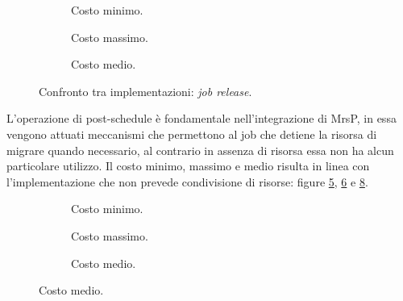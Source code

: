 {  \begin{figure}[htb]
    \centering
      \begin{subfigure}[b]{0.49\textwidth}
        \centering
        \resizebox{\linewidth}{!}\graficoReleaseMIN  
        \caption{Costo minimo.}
        \label{fig:releaseMin}
      \end{subfigure}
      \begin{subfigure}[b]{0.49\textwidth}
        \centering
        \resizebox{\linewidth}{!}\graficoReleaseMAX
        \caption{Costo massimo.}
        \label{fig:releaseMax}
      \end{subfigure}
      \begin{subfigure}[b]{0.49\textwidth}
        \centering
        \resizebox{\linewidth}{!}\graficoReleaseAVG
        \caption{Costo medio.}
        \label{fig:releaseAvg}
      \end{subfigure}

    \caption{Confronto tra implementazioni: \textit{job release}.}
    \label{fig:release}
  \end{figure}
        
\noindent L'operazione di post-schedule è fondamentale nell'integrazione di MrsP, in essa vengono attuati meccanismi che permettono al job che detiene la risorsa di migrare quando necessario, al contrario in assenza di risorsa essa non ha alcun particolare utilizzo. Il costo minimo, massimo e medio risulta in linea con l'implementazione che non prevede condivisione di risorse: figure \ref{fig:cxsMin}, \ref{fig:cxsMax} e \ref{fig:cxsAvg}.\\

  \begin{figure}[htb]
    \centering
      \begin{subfigure}[b]{0.49\textwidth}
        \centering
        \resizebox{\linewidth}{!}\graficoCxsMIN  
        \caption{Costo minimo.}
        \label{fig:cxsMin}
      \end{subfigure}
      \begin{subfigure}[b]{0.49\textwidth}
        \centering
        \resizebox{\linewidth}{!}\graficoCxsMAX
        \caption{Costo massimo.}
        \label{fig:cxsMax}
      \end{subfigure}
      \begin{subfigure}[b]{0.49\textwidth}
        \centering
        \resizebox{\linewidth}{!}\graficoCxsAVG
        \caption{Costo medio.}
        \label{fig:cxsAvg}
      \end{subfigure}


\end{figure}}
